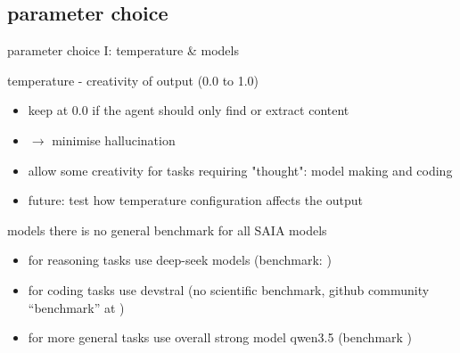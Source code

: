 \documentclass[t]{beamer}
\numberwithin{equation}{section}
\begin{document}
	\subsection{parameter choice}
	
	\begin{frame}[c]{parameter choice I: temperature \& models}
		\begin{block}{temperature - creativity of output (0.0 to 1.0)}
			\begin{itemize}
				\item keep at 0.0 if the agent should only find or extract content
				\item{$\rightarrow$} minimise hallucination
				\item allow some creativity for tasks requiring "thought": model making and coding
				\item {\color{blue}future}: test how temperature configuration affects the output 
			\end{itemize}
		\end{block}
		\pause
		\begin{block}{models}
			there is no general benchmark for all SAIA models
			\begin{itemize}
				\item for reasoning tasks use deep-seek models (benchmark: \autocite{deepSeek})
				\item for coding tasks use devstral (no scientific benchmark, github community \enquote{benchmark} at \autocite{huggFace})
				\item for more general tasks use overall strong model qwen3.5 (benchmark \autocite{qwenteam2026})
			\end{itemize}
		\end{block}
	\end{frame}
	
\end{document}
